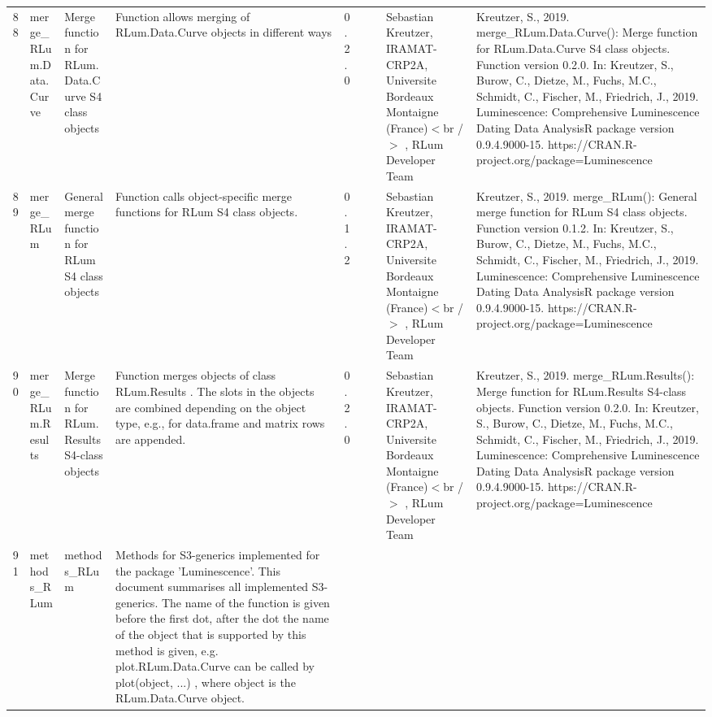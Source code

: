\begin{table}[ht]
\begin{tabular}{rllllllll}
 \\ 
  88 & merge\_RLum.Data.Curve & Merge function for RLum.Data.Curve S4 class objects & Function allows merging of RLum.Data.Curve objects in different ways & 0.2.0
 &  &  & Sebastian Kreutzer, IRAMAT-CRP2A, Universite Bordeaux Montaigne (France)$<$br /$>$ , RLum Developer Team & Kreutzer, S., 2019. merge\_RLum.Data.Curve(): Merge function for RLum.Data.Curve S4 class objects. Function version 0.2.0. In: Kreutzer, S., Burow, C., Dietze, M., Fuchs, M.C., Schmidt, C., Fischer, M., Friedrich, J., 2019. Luminescence: Comprehensive Luminescence Dating Data AnalysisR package version 0.9.4.9000-15. https://CRAN.R-project.org/package=Luminescence
 \\ 
  89 & merge\_RLum & General merge function for RLum S4 class objects & Function calls object-specific merge functions for RLum S4 class objects. & 0.1.2
 &  &  & Sebastian Kreutzer, IRAMAT-CRP2A, Universite Bordeaux Montaigne (France)$<$br /$>$ , RLum Developer Team & Kreutzer, S., 2019. merge\_RLum(): General merge function for RLum S4 class objects. Function version 0.1.2. In: Kreutzer, S., Burow, C., Dietze, M., Fuchs, M.C., Schmidt, C., Fischer, M., Friedrich, J., 2019. Luminescence: Comprehensive Luminescence Dating Data AnalysisR package version 0.9.4.9000-15. https://CRAN.R-project.org/package=Luminescence
 \\ 
  90 & merge\_RLum.Results & Merge function for RLum.Results S4-class objects & Function merges objects of class  RLum.Results . The slots in the objects are combined depending on the object type, e.g., for  data.frame  and  matrix  rows are appended. & 0.2.0
 &  &  & Sebastian Kreutzer, IRAMAT-CRP2A, Universite Bordeaux Montaigne (France)$<$br /$>$ , RLum Developer Team & Kreutzer, S., 2019. merge\_RLum.Results(): Merge function for RLum.Results S4-class objects. Function version 0.2.0. In: Kreutzer, S., Burow, C., Dietze, M., Fuchs, M.C., Schmidt, C., Fischer, M., Friedrich, J., 2019. Luminescence: Comprehensive Luminescence Dating Data AnalysisR package version 0.9.4.9000-15. https://CRAN.R-project.org/package=Luminescence
 \\ 
  91 & methods\_RLum & methods\_RLum & Methods for S3-generics implemented for the package 'Luminescence'. This document summarises all implemented S3-generics. The name of the function is given before the first dot, after the dot the name of the object that is supported by this method is given, e.g.  plot.RLum.Data.Curve  can be called by  plot(object, ...) , where  object  is the  RLum.Data.Curve  object. &  &  &  &  &  \\ 

\end{tabular}
\end{table}

